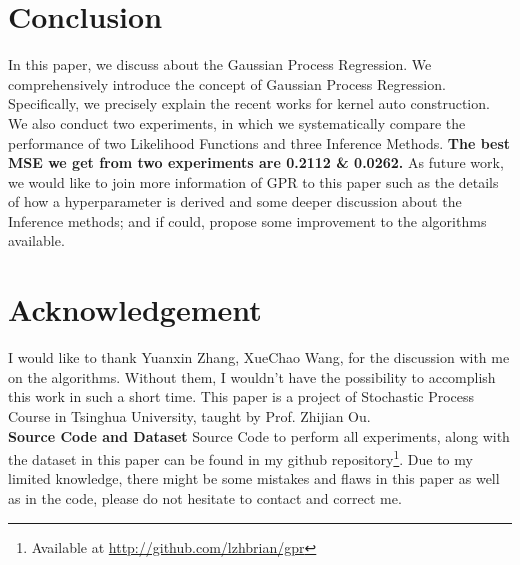 \documentclass{sig-alternate-05-2015}
\newcommand{\para}[1]{{\vspace{2pt} \bf \noindent #1 \hspace{8pt}}}
\begin{document}









\section{Conclusion} \label{sec:conclusion}
In this paper, we discuss about the Gaussian Process Regression.
We comprehensively introduce the concept of Gaussian Process Regression.
Specifically, we precisely explain the recent works for kernel auto construction.
We also conduct two experiments, in which we systematically compare the performance of two Likelihood Functions and three Inference Methods. 
\textbf{The best MSE we get from two experiments are 0.2112 \& 0.0262.}
As future work, we would like to join more information of GPR to this paper such as the details of how a hyperparameter is derived and some deeper discussion about the Inference methods; and if could, propose some improvement to the algorithms available.


\renewcommand{\baselinestretch}{1.1}
\balance
\section{Acknowledgement} \label{sec:acknowledgement}
I would like to thank Yuanxin Zhang, XueChao Wang, for the discussion with me on the algorithms. Without them, I wouldn't have the possibility to accomplish this work in such a short time. This paper is a project of Stochastic Process Course in Tsinghua University, taught by Prof. Zhijian Ou.\\

\para{Source Code and Dataset} Source Code to perform all experiments, along with the dataset in this paper can be found in my github repository\footnote{Available at \color{blue}\href{http://github.com/lzhbrian/gpr}{http://github.com/lzhbrian/gpr}}. Due to my limited knowledge, there might be some mistakes and flaws in this paper as well as in the code, please do not hesitate to contact and correct me.




\end{document}
